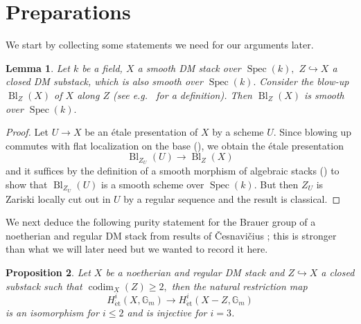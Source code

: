 \documentclass{amsart}
\newtheorem{prop}{Proposition}[section]
\newtheorem{lem}[prop]{Lemma}
\theoremstyle{definition}
\theoremstyle{remark}
\DeclareMathOperator{\Spec}{Spec}
\DeclareMathOperator{\codim}{codim}
\DeclareMathOperator{\Bl}{Bl}
\newcommand{\et}{\operatorname{\acute{e}t}}%
\begin{document}
\section{Preparations}\label{Section:Preparations}
We start by collecting some statements we need for our arguments later.

\begin{lem}\label{lem: blow up regular center smooth DM stack}
    Let $k$ be a field, $X$ a smooth DM stack over $\Spec(k),$ $Z\hookrightarrow X$ a closed DM substack, which is also smooth over $\Spec(k).$
    Consider the blow-up $\Bl_{Z}(X)$ of $X$ along $Z$ (see e.g.\ \cite[Example 3.2.6]{WeightedBlowUps} for a definition).
    Then $\Bl_{Z}(X)$ is smooth over $\Spec(k).$
\end{lem}
\begin{proof}
    Let $U\rightarrow X$ be an étale presentation of $X$ by a scheme $U.$ Since blowing up commutes with flat localization on the base (\cite[Corollary 3.2.14 (iii)]{WeightedBlowUps}), we obtain the étale presentation
    $$
        \Bl_{Z_{U}}(U)\rightarrow \Bl_{Z}(X)
    $$
    and it suffices by the definition of a smooth morphism of algebraic stacks (\cite[Tag 075U]{stacks}) to show that $\Bl_{Z_{U}}(U)$ is a smooth scheme over $\Spec(k).$
    But then $Z_{U}$ is Zariski locally cut out in $U$ by a regular sequence and the result is classical.
\end{proof}

We next deduce the following purity statement for the Brauer group of a noetherian and regular DM stack from results of \v{C}esnavi\v{c}ius \cite{CesnaviciusPurityBrauer}; this is stronger than what we will later need but we wanted to record it here.

\begin{prop}\label{Prop: purity Brauer}
    Let $X$ be a noetherian and regular DM stack and $Z\hookrightarrow X$ a closed substack such that $\codim_{X}(Z)\geq 2,$ then the natural restriction map
    $$
    H^{i}_{\et}(X,\mathbb{G}_{m})\rightarrow H^{i}_{\et}(X-Z,\mathbb{G}_{m})
    $$
    is an isomorphism for $i \leq 2$ and is injective for $i=3$.
\end{prop}
\end{document}
